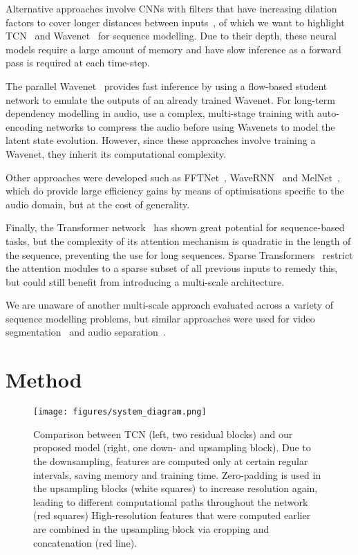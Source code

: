 \documentclass{article}
\begin{document}
Alternative approaches involve CNNs with filters that have increasing dilation factors to cover longer distances between inputs~\cite{kalchbrennerNeuralMachine2016,camposSkipRNN2017}, of which we want to highlight TCN~\cite{bai2018convolutional} and Wavenet~\cite{dielemanWaveNetGenerative2016} for sequence modelling.
Due to their depth, these neural models require a large amount of memory and have slow inference as a forward pass is required at each time-step.

The parallel Wavenet~\cite{oordParallelWaveNet2017} provides fast inference by using a flow-based student network to emulate the outputs of an already trained Wavenet.
For long-term dependency modelling in audio, \cite{dielemanChallengeRealistic2018} use a complex, multi-stage training with auto-encoding networks to compress the audio before using Wavenets to model the latent state evolution.
However, since these approaches involve training a Wavenet, they inherit its computational complexity.

Other approaches were developed such as FFTNet~\cite{jinFFTNetRealTime2018}, WaveRNN~\cite{kalchbrennerEfficientNeural2018} and MelNet~\cite{vasquezMelNetGenerative2019}, which do provide large efficiency gains by means of optimisations specific to the audio domain, but at the cost of generality.

Finally, the Transformer network~\cite{vaswaniAttentionAll2017} has shown great potential for sequence-based tasks, but the complexity of its attention mechanism is quadratic in the length of the sequence, preventing the use for long sequences.
Sparse Transformers~\cite{childGeneratingLong2019} restrict the attention modules to a sparse subset of all previous inputs to remedy this, but could still benefit from introducing a multi-scale architecture.

We are unaware of another multi-scale approach evaluated across a variety of sequence modelling problems, but similar approaches were used for video segmentation~\cite{shelhamerClockworkConvnets2016} and audio separation~\cite{stollerWaveUNetMultiScale2018}.

\section{Method}
\label{sec:method}

\begin{figure*}[t]
  \centering
  \centerline{\texttt{[image: figures/system\_diagram.png]}}
  \caption{Comparison between TCN (left, two residual blocks) and our proposed model (right, one down- and upsampling block). Due to the downsampling, features are computed only at certain regular intervals, saving memory and training time. Zero-padding is used in the upsampling blocks (white squares) to increase resolution again, leading to different computational paths throughout the network (red squares) High-resolution features that were computed earlier are combined in the upsampling block via cropping and concatenation (red line).}
  \label{fig:system_overview}
\end{figure*}
\end{document}
